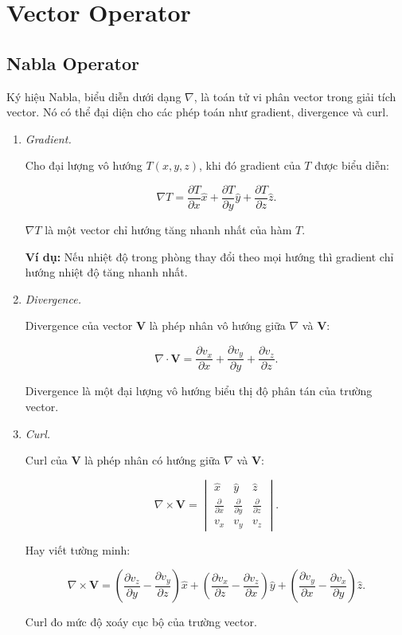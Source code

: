 \chapter{Vector Operator}
\section{Nabla Operator}

Ký hiệu Nabla, biểu diễn dưới dạng $\nabla$, là toán tử vi phân vector trong giải tích vector. 
Nó có thể đại diện cho các phép toán như gradient, divergence và curl.

\begin{enumerate}

\item \textit{Gradient.}

Cho đại lượng vô hướng $T(x,y,z)$, khi đó gradient của $T$ được biểu diễn:

\[
\nabla T
=
\frac{\partial T}{\partial x}\hat{x}
+
\frac{\partial T}{\partial y}\hat{y}
+
\frac{\partial T}{\partial z}\hat{z}.
\]

$\nabla T$ là một vector chỉ hướng tăng nhanh nhất của hàm $T$.

\textbf{Ví dụ:} Nếu nhiệt độ trong phòng thay đổi theo mọi hướng thì gradient chỉ hướng nhiệt độ tăng nhanh nhất.

\item \textit{Divergence.}

Divergence của vector $\mathbf{V}$ là phép nhân vô hướng giữa $\nabla$ và $\mathbf{V}$:

\[
\nabla \cdot \mathbf{V}
=
\frac{\partial v_x}{\partial x}
+
\frac{\partial v_y}{\partial y}
+
\frac{\partial v_z}{\partial z}.
\]

Divergence là một đại lượng vô hướng biểu thị độ phân tán của trường vector.

\item \textit{Curl.}

Curl của $\mathbf{V}$ là phép nhân có hướng giữa $\nabla$ và $\mathbf{V}$:

\[
\nabla \times \mathbf{V}
=
\begin{vmatrix}
\hat{x} & \hat{y} & \hat{z} \\
\frac{\partial}{\partial x} &
\frac{\partial}{\partial y} &
\frac{\partial}{\partial z} \\
v_x & v_y & v_z
\end{vmatrix}.
\]

Hay viết tường minh:

\[
\nabla \times \mathbf{V}
=
\left(
\frac{\partial v_z}{\partial y}
-
\frac{\partial v_y}{\partial z}
\right)\hat{x}
+
\left(
\frac{\partial v_x}{\partial z}
-
\frac{\partial v_z}{\partial x}
\right)\hat{y}
+
\left(
\frac{\partial v_y}{\partial x}
-
\frac{\partial v_x}{\partial y}
\right)\hat{z}.
\]

Curl đo mức độ xoáy cục bộ của trường vector.

\end{enumerate}
